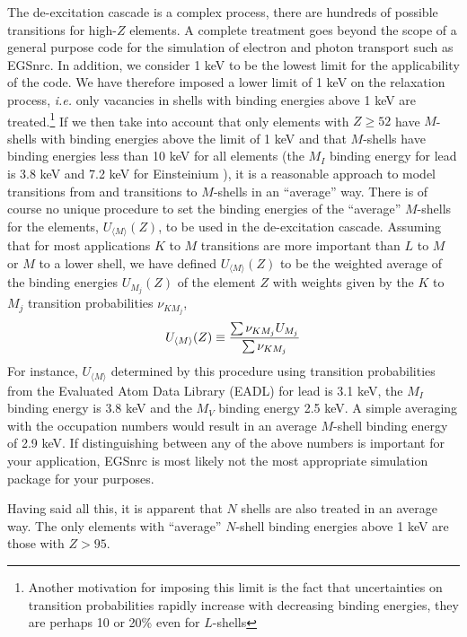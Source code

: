 The de-excitation cascade is a complex process, there are
hundreds of possible transitions for high-$Z$ elements.
A complete treatment goes beyond the scope of a general
purpose code for the simulation of electron and photon transport
such as EGSnrc. In addition, we consider 1 keV to be the lowest
limit for the applicability of the code. We have therefore imposed
a lower limit of 1 keV on the relaxation process, {\em i.e.} only
vacancies in shells with binding energies
above 1 keV are treated.\footnote{Another motivation
for imposing this limit is the fact that uncertainties on
transition probabilities rapidly increase with
decreasing binding energies, they are perhaps 10 or 20\%
even for $L$-shells} If we then take into account that
only elements with $Z \ge 52$ have $M$-shells with binding energies
above the limit of 1 keV and that $M$-shells have binding energies less
than 10 keV for all elements (the $M_I$ binding energy for
lead is 3.8 keV and 7.2 keV for Einsteinium \cite{Pe91}),
it is a reasonable approach to model transitions from and
transitions to $M$-shells in an ``average'' way.
There is of course no unique procedure to set the binding energies of the
``average'' $M$-shells for the elements, $U_{\langle M \rangle}(Z)$,
to be used in the de-excitation cascade.
Assuming that for most applications $K$ to $M$ transitions
are more important than $L$ to $M$ or $M$ to a lower shell,
we have defined $U_{\langle M \rangle}(Z)$ to be the weighted average
of the binding energies $U_{M_j}(Z)$ of the element $Z$ with
weights given by the $K$ to $M_j$ transition probabilities $\nu_{KM_j}$,
\begin{equation}
U_{\langle M \rangle}(Z) \equiv {\sum \nu_{KM_j} U_{M_j} \over
\sum \nu_{KM_j}}
\end{equation}
For instance, $U_{\langle M \rangle}$ determined by this
procedure using transition probabilities from the
Evaluated Atom Data Library (EADL) \cite{Pe91} for lead
is 3.1 keV, the $M_I$ binding energy is 3.8 keV and the
$M_V$ binding energy 2.5 keV. A simple averaging with the
occupation numbers would result in an average $M$-shell binding
energy of 2.9 keV. If distinguishing between any of the above
numbers is important for your application, EGSnrc is most
likely not the most appropriate simulation package for
your purposes.

Having said all this, it is apparent that $N$ shells are
also treated in an average way. The only elements with
``average'' $N$-shell binding energies above 1 keV are those with $Z > 95$.


